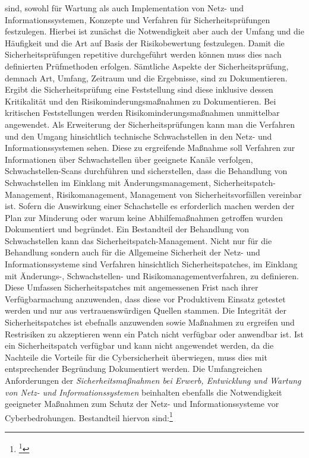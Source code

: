 \documentclass[11pt,a4paper,hidelinks]{article}   %
\begin{document}
sind, sowohl für Wartung als auch Implementation von Netz- und Informationssystemen, Konzepte und Verfahren für Sicherheitsprüfungen festzulegen. Hierbei ist zunächst die Notwendigkeit aber auch der Umfang und die Häufigkeit und die Art auf Basis der Risikobewertung festzulegen. Damit die Sicherheitsprüfungen repetitive durchgeführt werden können muss dies nach definierten Prüfmethoden erfolgen. Sämtliche Aspekte der Sicherheitsprüfung, demnach Art, Umfang, Zeitraum und die Ergebnisse, sind zu Dokumentieren. Ergibt die Sicherheitsprüfung eine Feststellung sind diese inklusive dessen Kritikalität und den Risikominderungsmaßnahmen zu Dokumentieren. Bei kritischen Feststellungen werden Risikominderungsmaßnahmen unmittelbar angewendet. Als Erweiterung der Sicherheitsprüfungen kann man die Verfahren und den Umgang hinsichtlich technische Schwachstellen in den Netz- und Informationssystemen sehen. Diese zu ergreifende Maßnahme soll Verfahren zur Informationen über Schwachstellen über geeignete Kanäle verfolgen, Schwachstellen-Scans durchführen und sicherstellen, dass die Behandlung von Schwachstellen im Einklang mit Änderungsmanagement, Sicherheitspatch-Management, Risikomanagement, Management von Sicherheitsvorfällen vereinbar ist. Sofern die Auswirkung einer Schachstelle es erforderlich machen werden der Plan zur Minderung oder warum keine Abhilfemaßnahmen getroffen wurden Dokumentiert und begründet. Ein Bestandteil der Behandlung von Schwachstellen kann das Sicherheitspatch-Management. Nicht nur für die Behandlung sondern auch für die Allgemeine Sicherheit der Netz- und Informationssysteme sind Verfahren hinsichtlich Sicherheitspatches, im Einklang mit Änderungs-,  Schwachstellen-  und Risikomanagementverfahren, zu definieren. Diese Umfassen Sicherheitspatches mit angemessenen Frist nach ihrer Verfügbarmachung anzuwenden, dass diese vor Produktivem Einsatz getestet werden und nur aus vertrauenswürdigen Quellen stammen. Die Integrität der Sicherheitspatches ist ebefnalls anzuwenden sowie Maßnahmen zu ergreifen und Restrisiken zu akzeptieren wenn ein Patch nicht verfügbar oder anwendbar ist. Ist ein Sicherheitspatch verfügbar und kann nicht angewendet werden, da die Nachteile die Vorteile für die Cybersicherheit überwiegen, muss dies mit entsprechender Begründung Dokumentiert werden. Die Umfangreichen Anforderungen der \emph{Sicherheitsmaßnahmen bei Erwerb, Entwicklung und Wartung von Netz- und Informationssystemen} beinhalten ebenfalls die Notwendigkeit geeigneter Maßnahmen zum Schutz der Netz- und Informationssysteme vor Cyberbedrohungen. Bestandteil hiervon sind:\footnote{
                    \footcite[Vgl. Anhang, Nummer 6 bis 6.6.2 \& 6.10][]{EU2024-2690}
                }
\end{document}
